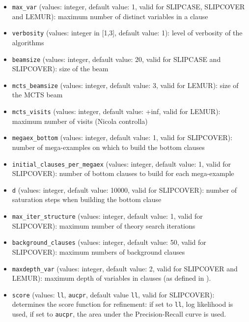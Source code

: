 \documentclass[a4paper,10pt]{scrartcl}
\begin{document}
\begin{itemize}
\item \verb|max_var| (values: integer, default value: 1, valid for SLIPCASE,
SLIPCOVER and LEMUR): maximum number of distinct variables in a clause
\item \verb|verbosity| (values: integer in [1,3], default value: 1): level of verbosity of the algorithms
\item \verb|beamsize|  (values: integer, default value: 20, valid for SLIPCASE and SLIPCOVER): size of the beam 
\item \verb|mcts_beamsize|  (values: integer, default value: 3, valid for LEMUR): size of the MCTS beam

\item \verb|mcts_visits|  (values: integer, default value: +inf, valid for LEMUR): maximum number of visits (Nicola controlla)

\item \verb|megaex_bottom| (values: integer, default value: 1, valid for SLIPCOVER): number of mega-examples on which to build the bottom clauses
\item \verb|initial_clauses_per_megaex| (values: integer, default value: 1, valid for SLIPCOVER): 
 number of bottom clauses to build for each mega-example
\item \verb|d| (values: integer, default value: 10000, valid for SLIPCOVER): 
 number of saturation steps when building the bottom clause
\item \verb|max_iter_structure| (values: integer, default value: 1, valid for SLIPCOVER): 
maximum  number of theory search iterations
\item \verb|background_clauses| (values: integer, default value: 50, valid for SLIPCOVER): 
 maximum numbers of background clauses
\item \verb|maxdepth_var| (values: integer, default value: 2, valid for SLIPCOVER and LEMUR): maximum depth of
variables in clauses (as defined in \cite{DBLP:journals/ai/Cohen95}).
\item \verb|score| (values: \verb|ll|, \verb|aucpr|, default value \verb|ll|, valid for SLIPCOVER): determines the score function for refinement: if set to \verb|ll|, log likelihood is used, if set to \verb|aucpr|, the area under the 
Precision-Recall curve is used. 
\end{itemize}
\end{document}

